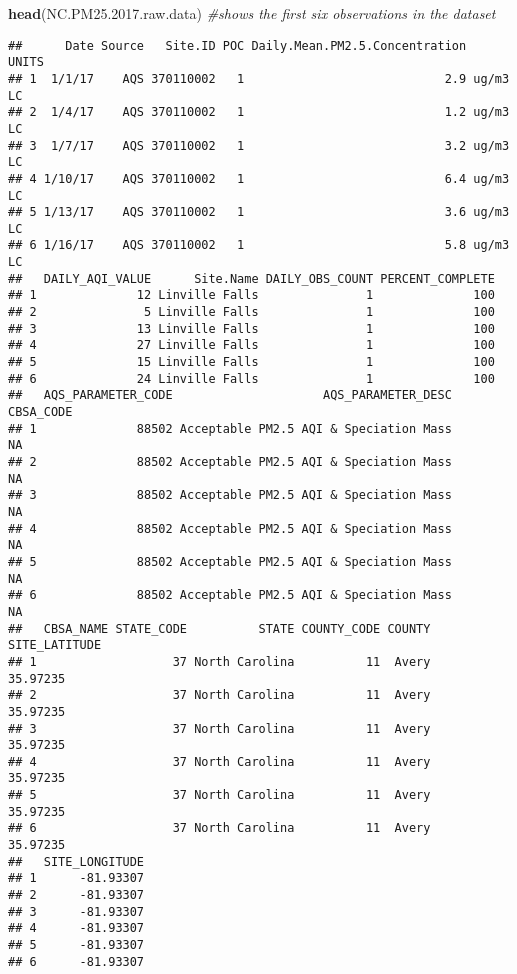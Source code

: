 \documentclass[]{article}
\newenvironment{Shaded}{\begin{snugshade}}{\end{snugshade}}
\newcommand{\KeywordTok}[1]{\textcolor[rgb]{0.13,0.29,0.53}{\textbf{#1}}}
\newcommand{\FloatTok}[1]{\textcolor[rgb]{0.00,0.00,0.81}{#1}}
\newcommand{\CommentTok}[1]{\textcolor[rgb]{0.56,0.35,0.01}{\textit{#1}}}
\newcommand{\NormalTok}[1]{#1}
\begin{document}
\begin{Shaded}
\begin{Highlighting}[]
\KeywordTok{head}\NormalTok{(NC.PM25.}\FloatTok{2017.}\NormalTok{raw.data) }\CommentTok{#shows the first six observations in the dataset}
\end{Highlighting}
\end{Shaded}

\begin{verbatim}
##      Date Source   Site.ID POC Daily.Mean.PM2.5.Concentration    UNITS
## 1  1/1/17    AQS 370110002   1                            2.9 ug/m3 LC
## 2  1/4/17    AQS 370110002   1                            1.2 ug/m3 LC
## 3  1/7/17    AQS 370110002   1                            3.2 ug/m3 LC
## 4 1/10/17    AQS 370110002   1                            6.4 ug/m3 LC
## 5 1/13/17    AQS 370110002   1                            3.6 ug/m3 LC
## 6 1/16/17    AQS 370110002   1                            5.8 ug/m3 LC
##   DAILY_AQI_VALUE      Site.Name DAILY_OBS_COUNT PERCENT_COMPLETE
## 1              12 Linville Falls               1              100
## 2               5 Linville Falls               1              100
## 3              13 Linville Falls               1              100
## 4              27 Linville Falls               1              100
## 5              15 Linville Falls               1              100
## 6              24 Linville Falls               1              100
##   AQS_PARAMETER_CODE                     AQS_PARAMETER_DESC CBSA_CODE
## 1              88502 Acceptable PM2.5 AQI & Speciation Mass        NA
## 2              88502 Acceptable PM2.5 AQI & Speciation Mass        NA
## 3              88502 Acceptable PM2.5 AQI & Speciation Mass        NA
## 4              88502 Acceptable PM2.5 AQI & Speciation Mass        NA
## 5              88502 Acceptable PM2.5 AQI & Speciation Mass        NA
## 6              88502 Acceptable PM2.5 AQI & Speciation Mass        NA
##   CBSA_NAME STATE_CODE          STATE COUNTY_CODE COUNTY SITE_LATITUDE
## 1                   37 North Carolina          11  Avery      35.97235
## 2                   37 North Carolina          11  Avery      35.97235
## 3                   37 North Carolina          11  Avery      35.97235
## 4                   37 North Carolina          11  Avery      35.97235
## 5                   37 North Carolina          11  Avery      35.97235
## 6                   37 North Carolina          11  Avery      35.97235
##   SITE_LONGITUDE
## 1      -81.93307
## 2      -81.93307
## 3      -81.93307
## 4      -81.93307
## 5      -81.93307
## 6      -81.93307
\end{verbatim}
\end{document}
